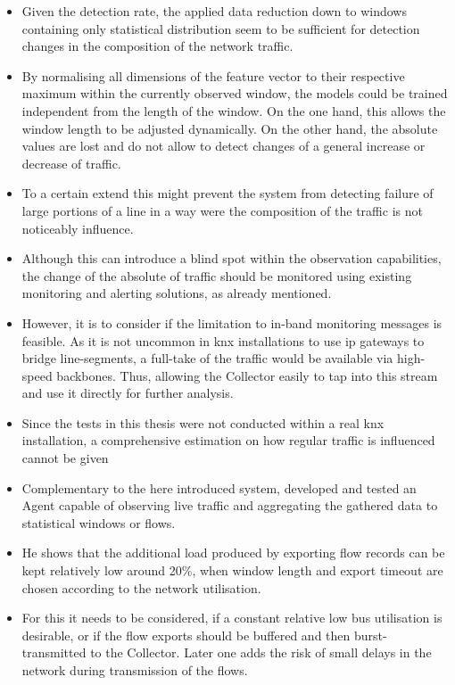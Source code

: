 \begin{itemize}
	\item Given the detection rate, the applied data reduction down to windows containing only statistical distribution seem to be sufficient for detection changes in the composition of the network traffic.
	\item By normalising all dimensions of the feature vector to their respective maximum within the currently observed window, the models could be trained independent from the length of the window. On the one hand, this allows the window length to be adjusted dynamically.
	On the other hand, the absolute values are lost and do not allow to detect changes of a general increase or decrease of traffic. 
	\item To a certain extend this might prevent the system from detecting failure of large portions of a line in a way were the composition of the traffic is not noticeably influence.
	\item Although this can introduce a blind spot within the observation capabilities, the change of the absolute of traffic should be monitored using existing monitoring and alerting solutions, as already mentioned.
	
	\item However, it is to consider if the limitation to in-band monitoring messages is feasible. As it is not uncommon in \gls{knx} installations to use \gls{ip} gateways to bridge line-segments, a full-take of the traffic would be available via high-speed backbones. Thus, allowing the Collector easily to tap into this stream and use it directly for further analysis.
		
	\item Since the tests in this thesis were not conducted within a real \gls{knx} installation, a comprehensive estimation on how regular traffic is influenced cannot be given
	\item Complementary to the here introduced system, \textcite{Jung2018} developed and tested an Agent capable of observing live traffic and aggregating the gathered data to statistical windows or flows.
	\item He shows that the additional load produced by exporting flow records can be kept relatively low around 20\%, when window length and export timeout are chosen according to the network utilisation.
	\item For this it needs to be considered, if a constant relative low bus utilisation is desirable, or if the flow exports should be buffered and then burst-transmitted to the Collector. Later one adds the risk of small delays in the network during transmission of the flows.
	

\end{itemize}
